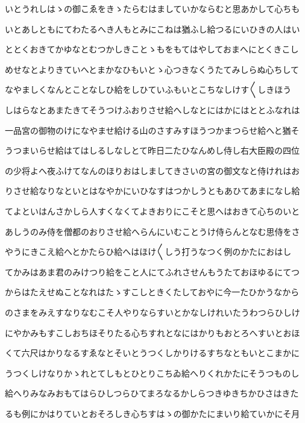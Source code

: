 \documentclass[a4paper,11pt,landscape]{ltjtarticle}
\begin{document}
いとうれしはゝの御こゑをきゝたらむはましていかならむと思あかして心ちも
\par\medskip
いとあしともにてわたるへき人もとみにこねは猶ふし給つるにいひきの人はい
\par\medskip
ととくおきてかゆなとむつかしきことゝもをもてはやしておまへにとくきこし
\par\medskip
めせなとよりきていへとまかなひもいとゝ心つきなくうたてみしらぬ心ちして
\par\medskip
なやましくなんとことなしひ給をしひていふもいとこちなしけす〱しきほう
\par\medskip
しはらなとあまたきてそうつけふおりさせ給へしなとにはかにはととふなれは
\par\medskip
一品宮の御物のけになやませ給ける山のさすみすほうつかまつらせ給へと猶そ
\par\medskip
うつまいらせ給はてはしるしなしとて昨日二たひなんめし侍し右大臣殿の四位
\par\medskip
の少将よへ夜ふけてなんのほりおはしましてきさいの宮の御文なと侍けれはお
\par\medskip
りさせ給なりなといとはなやかにいひなすはつかしうともあひてあまになし給
\par\medskip
てよといはんさかしら人すくなくてよきおりにこそと思へはおきて心ちのいと
\par\medskip
あしうのみ侍を僧都のおりさせ給へらんにいむことうけ侍らんとなむ思侍をさ
\par\medskip
やうにきこえ給へとかたらひ給へはほけ〱しう打うなつく例のかたにおはし
\par\medskip
てかみはあま君のみけつり給をこと人にてふれさせんもうたておほゆるにてつ
\par\medskip
からはたえせぬことなれはたゝすこしときくたしておやに今一たひかうなから
\par\medskip
のさまをみえすなりなむこそ人やりならすいとかなしけれいたうわつらひしけ
\par\medskip
にやかみもすこしおちほそりたる心ちすれとなにはかりもおとろへすいとおほ
\par\medskip
くて六尺はかりなるすゑなとそいとうつくしかりけるすちなともいとこまかに
\par\medskip
うつくしけなりかゝれとてしもとひとりこちゐ給へりくれかたにそうつものし
\par\medskip
給へりみなみおもてはらひしつらひてまろなるかしらつきゆきちかひさはきた
\par\medskip
るも例にかはりていとおそろしき心ちすはゝの御かたにまいり給ていかにそ月
\par\medskip
\end{document}
